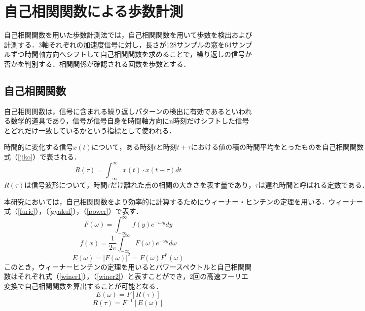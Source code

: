 \chapter{自己相関関数による歩数計測}
自己相関関数を用いた歩数計測法では，自己相関関数を用いて歩数を検出および計測する．3軸それぞれの加速度信号に対し，長さが128サンプルの窓を64サンプルずつ時間軸方向へシフトして自己相関関数を求めることで，繰り返しの信号か否かを判別する．相関関係が確認される回数を歩数とする．

\section{自己相関関数}
自己相関関数は，信号に含まれる繰り返しパターンの検出に有効であるといわれる数学的道具であり，信号が信号自身を時間軸方向にn時刻だけシフトした信号とどれだけ一致しているかという指標として使われる．

\begin{math}
  時間的に変化する信号x(t)について，ある時刻tと時刻t+ \tau における値の積の時間平均をとったものを自己相関関数といい，
\end{math}
式（\ref{jiko}）で表される．
\begin{equation}
  \label{jiko}
  R(\tau) = \int_{-\infty}^{\infty} x(t) \cdot x(t+\tau)dt
\end{equation}
\begin{math}
  R( \tau )は信号波形について，時間τだけ離れた点の相関の大きさを表す量であり， \tau は遅れ時間と呼ばれる定数である．
\end{math}

\begin{math}
本研究においては，自己相関関数をより効率的に計算するためにウィーナー・ヒンチンの定理を用いる．ウィーナー・ヒンチンの定理とは，広義定常確率過程のパワースペクトル密度が，対応する自己相関関数のフーリエ変換であることを示した定理である．ある非周期関数f(x)に対するフーリエ変換とフーリエ逆変換，さらにパワースペクトルをそれぞれ
\end{math}
式（\ref{furie}），（\ref{gyakuf}），（\ref{power}）で表す．
\begin{equation}
  \label{furie}
  F(\omega) = \int^{\infty}_{-\infty} f(y)e^{-i\omega y}dy
\end{equation}
\begin{equation}
  \label{gyakuf}
  f(x) = \frac{1}{2π} \int^{\infty}_{-\infty} F(\omega)e^{-\omega y}d\omega
\end{equation}
\begin{equation}
  \label{power}
  E(\omega) = |F(\omega)|^{2} = F(\omega)F^{*}(\omega)
\end{equation}
このとき，ウィーナーヒンチンの定理を用いるとパワースペクトルと自己相関関数はそれぞれ式（\ref{winer1}），（\ref{winer2}）と表すことができ，2回の高速フーリエ変換で自己相関関数を算出することが可能となる．
\begin{equation}
  \label{winer1}
  E(\omega) = F[R(\tau)]
\end{equation}
\begin{equation}
  \label{winer2}
  R(\tau) = F^{-1}[E(\omega)]
\end{equation}


